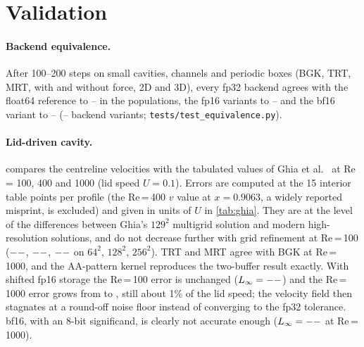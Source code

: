 \documentclass[11pt]{article}
\providecommand{\eqMaxFpThirtyTwo}{--}\providecommand{\eqMaxFpSixteen}{--}
\providecommand{\eqMaxBf}{--}\providecommand{\eqCount}{--}
\begin{document}
\section{Validation}
\label{sec:validation}
\paragraph{Backend equivalence.} After 100--200 steps on small cavities, channels and
periodic boxes (BGK, TRT, MRT, with and without force, 2D and 3D), every fp32 backend
agrees with the float64 reference to \eqMaxFpThirtyTwo{} in the populations, the fp16
variants to \eqMaxFpSixteen{} and the bf16 variant to \eqMaxBf{} (\eqCount{} backend
variants; \texttt{tests/test\_equivalence.py}).

\paragraph{Lid-driven cavity.}
 compares the centreline velocities with the tabulated values of Ghia et
al.~\citep{ghia1982} at Re = 100, 400 and 1000 (lid speed $U=0.1$). Errors are computed at
the 15 interior table points per profile (the Re\,=\,400 $v$ value at $x=0.9063$, a widely
reported misprint, is excluded) and given in units of $U$ in \cref{tab:ghia}. They are at
the level of the differences between Ghia's $129^2$ multigrid solution and modern
high-resolution solutions, and do not decrease further with grid refinement at Re\,=\,100
($--$, $--$, $--$ on $64^2$, $128^2$,
$256^2$). TRT and MRT agree with BGK at Re\,=\,1000, and the AA-pattern kernel reproduces
the two-buffer result exactly. With shifted fp16 storage the Re\,=\,100 error is unchanged
($L_\infty=--$) and the Re\,=\,1000 error grows from \ghiaThouLinf{} to
\ghiaThouHalLinf{}, still about 1\% of the lid speed; the velocity field then stagnates at a
round-off noise floor instead of converging to the fp32 tolerance. bf16, with an 8-bit
significand, is clearly not accurate enough ($L_\infty=--$ at Re\,=\,1000).
\end{document}
